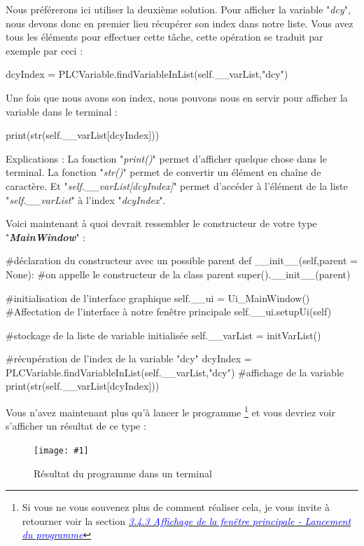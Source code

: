 \documentclass[12pt]{report}    %
\newcommand{\iImage}[3]{\begin{figure}[H]\centering\texttt{[image: \#1]}\caption{#2}\end{figure}}
\newcommand{\italic}[1]{{\itshape #1}}
\newcommand{\ib}[1]{{\bfseries\itshape #1}}
\newcommand{\smallSkip}{\vskip 0.5cm}
\newcommand{\lref}[2]{\hyperref[#1]{\textcolor{blue}{\italic{#2}}}}
\newcommand{\rootIm}{images/ENIBSupervision/}
\begin{document}
Nous préférerons ici utiliser la deuxième solution. Pour afficher la variable "\italic{dcy}", nous devons donc en premier lieu récupérer son index dans notre liste. Vous avez tous les éléments pour effectuer cette tâche, cette opération se traduit par exemple par ceci :
\begin{pyCode}
dcyIndex = PLCVariable.findVariableInList(self.__varList,"dcy")
\end{pyCode}
Une fois que nous avons son index, nous pouvons nous en servir pour afficher la variable dans le terminal :
\begin{pyCode}
print(str(self.__varList[dcyIndex]))
\end{pyCode}
Explications :\newline
La fonction "\italic{print()}" permet d'afficher quelque chose dans le terminal.\newline
La fonction "\italic{str()}" permet de convertir un élément en chaîne de caractère.\newline
Et "\italic{self.\_\_varList[dcyIndex]}" permet d'accéder à l'élément de la liste "\italic{self.\_\_varList}" à l'index "\italic{dcyIndex}".\smallSkip

Voici maintenant à quoi devrait ressembler le constructeur de votre type "\ib{MainWindow}" :
\begin{pyCode}
#déclaration du constructeur avec un possible parent
def __init__(self,parent = None):
	#on appelle le constructeur de la class parent
	super().__init__(parent)

	#initialisation de l'interface graphique
	self.__ui = Ui_MainWindow()
	#Affectation de l'interface à notre fenêtre principale
	self.__ui.setupUi(self)

	#stockage de la liste de variable initialisée
	self.__varList = initVarList()

	#récupération de l'index de la variable "dcy"
	dcyIndex = PLCVariable.findVariableInList(self.__varList,"dcy")
	#affichage de la variable
	print(str(self.__varList[dcyIndex]))
\end{pyCode}
\smallSkip

Vous n'avez maintenant plus qu'à lancer le programme
\footnote{
Si vous ne vous souvenez plus de comment réaliser cela, je vous invite à retourner voir la section \lref{tag-startProgFromCmdLine}{3.4.3 Affichage de la fenêtre principale - Lancement du programme}
}
et vous devriez voir s'afficher un résultat de ce type :
\iImage{\rootIm enibSup_result_printPLCVar.png}{Résultat du programme dans un terminal}{0.4}
\end{document}
